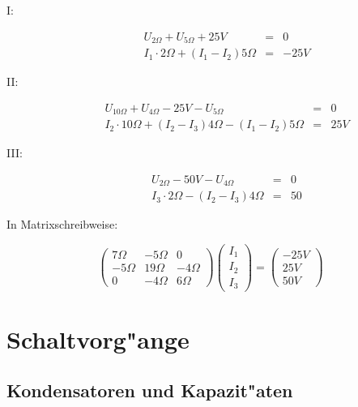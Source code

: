 \documentclass[german, 10pt, a4paper, headsepline]{scrreprt}
\theoremstyle{remark}
\begin{document}
\begin{description}
	\item[I:]
		\begin{eqnarray}
			U_{2\Omega} + U_{5\Omega} + 25 V &	= &	0 \nonumber \\
			I_1\cdotp 2\Omega +(I_1-I_2)5\Omega &	= &	-25V \nonumber
		\end{eqnarray}
	\item[II:]
		\begin{eqnarray}
			U_{10\Omega} + U_{4\Omega} - 25 V -U_{5\Omega}&		= &	0 \nonumber \\
			I_2\cdotp 10\Omega + (I_2-I_3) 4\Omega - (I_1-I_2) 5\Omega &	= &	25V\nonumber
		\end{eqnarray}
	\item[III:]
		\begin{eqnarray}
			U_{2\Omega} - 50V - U_{4\Omega} &	= &	0 \nonumber \\
			I_{3}\cdotp 2\Omega - (I_2-I_3)4\Omega &	= &	50\nonumber
		\end{eqnarray}
\end{description}

In Matrixschreibweise:

\begin{displaymath}
	\left (
	\begin{array}{ccc}
		7 \Omega &	-5\Omega &	0\\
		-5 \Omega &	19\Omega &	-4\Omega\\
		0 &		-4\Omega &	6\Omega
	\end{array}
	\right ) \left (
	\begin{array}{c}
		I_1\\
		I_2\\
		I_3
	\end{array}
	\right ) = \left (
	\begin{array}{c}
		-25 V\\
		25 V\\
		50 V
	\end{array}
	\right )
\end{displaymath}

\chapter{Schaltvorg"ange}

\section{Kondensatoren und Kapazit"aten}
\end{document}
